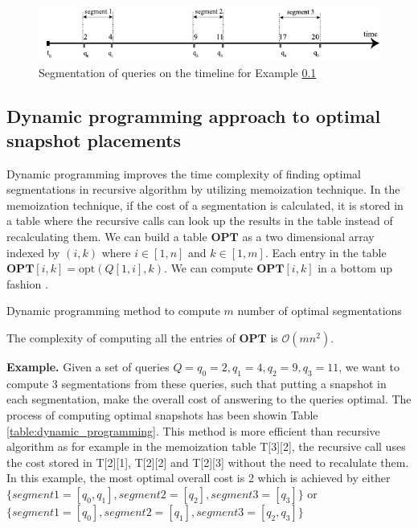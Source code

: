 \begin{figure}
	\centering
	\includegraphics[width=\textwidth]{figs/example_recursive_s.pdf}
	\caption{Segmentation of queries on the timeline for Example \ref{}}
	\label{fig:example_recursive_segmentation}
\end{figure}


\subsection{Dynamic programming approach to optimal snapshot placements}

Dynamic programming improves the time complexity of finding optimal segmentations in recursive algorithm by utilizing memoization technique. In the memoization technique, if the cost of a segmentation is calculated, it is stored in a table where the recursive calls can look up the results in the table instead of recalculating them. We can build a table $\mathbf{OPT}$ as a two dimensional array
indexed by $(i, k)$ where $i\in [1, n]$ and $k\in [1, m]$.  Each entry
in the table $\mathbf{OPT}[i,k] = \mathrm{opt}(Q[1,i], k)$.
We can compute $\mathbf{OPT}[i,k]$ in a bottom up fashion \cite{}.

\begin{algorithm}[H]
\SetAlgoLined
\caption{Dynamic programming method to compute $m$ number of optimal segmentations}
\label{alg:dynamic_programming}
\DontPrintSemicolon
 
\end{algorithm}

The complexity of computing all the entries of $\mathbf{OPT}$ is $\mathcal{O}(mn^2)$.

\textbf{Example.} Given a set of queries $Q={q_0=2,q_1=4,q_2=9,q_3=11}$, we want to compute 3 segmentations from these queries, such that putting a snapshot in each segmentation, make the overall cost of answering to the queries optimal. The process of computing optimal snapshots has been showin Table \ref{table:dynamic_programming}. This method is more efficient than recursive algorithm as for example in the memoization table T[3][2], the recursive call uses the cost stored in T[2][1], T[2][2] and T[2][3] without the need to recalulate them. In this example, the most optimal overall cost is 2 which is achieved by either $\{segment1 =[q_0,q_1],segment2=[q_2],segment3=[q_3]\}$ or $\{segment1 =[q_0], segment2 = [q_1], segment3 = [q_2, q_3]\}$

